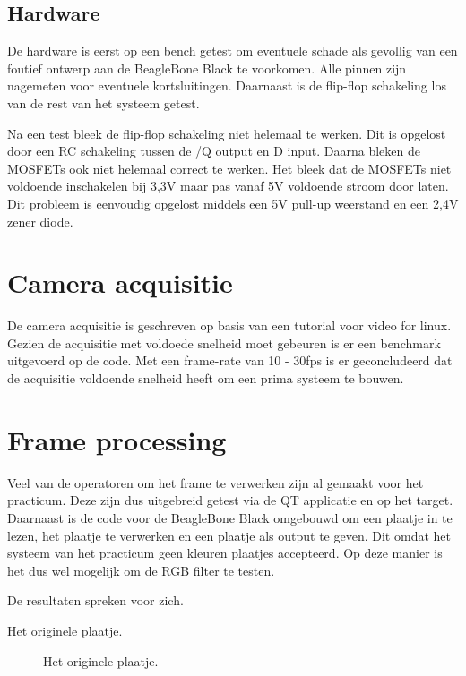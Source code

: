 \subsection{Hardware}
\label{sub:gpioHard}

De hardware is eerst op een bench getest om eventuele schade als gevollig van
een foutief ontwerp aan de BeagleBone Black te voorkomen. Alle pinnen zijn
nagemeten voor eventuele kortsluitingen. Daarnaast is de flip-flop schakeling
los van de rest van het systeem getest.

Na een test bleek de flip-flop schakeling niet helemaal te werken. Dit is opgelost
door een RC schakeling tussen de /Q output en D input. Daarna bleken de MOSFETs
ook niet helemaal correct te werken. Het bleek dat de MOSFETs niet voldoende
inschakelen bij 3,3V maar pas vanaf 5V voldoende stroom door laten. Dit probleem
is eenvoudig opgelost middels een 5V pull-up weerstand en een 2,4V zener diode.

\section{Camera acquisitie}
\label{sec:camAcq}

De camera acquisitie is geschreven op basis van een tutorial voor video for
linux. Gezien de acquisitie met voldoede snelheid moet gebeuren is er een
benchmark uitgevoerd op de code. Met een frame-rate van 10 - 30fps is er
geconcludeerd dat de acquisitie voldoende snelheid heeft om een prima
systeem te bouwen.

\section{Frame processing}
\label{sec:framePross}

Veel van de operatoren om het frame te verwerken zijn al gemaakt voor het
practicum. Deze zijn dus uitgebreid getest via de QT applicatie en op het
target. Daarnaast is de code voor de BeagleBone Black omgebouwd om een
plaatje in te lezen, het plaatje te verwerken en een plaatje als output
te geven. Dit omdat het systeem van het practicum geen kleuren plaatjes
accepteerd. Op deze manier is het dus wel mogelijk om de RGB filter te
testen.

De resultaten spreken voor zich.

Het originele plaatje.
\begin{figure}
    \begin{center}
    \end{center}
    \caption{Het originele plaatje.}
    \label{fig:org}
\end{figure}

